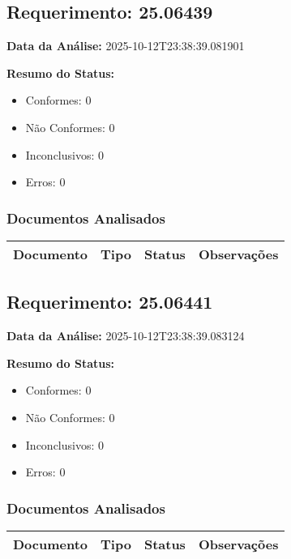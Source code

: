 \documentclass[12pt,a4paper]{article}
\begin{document}
\subsection{Requerimento: 25.06439}

\textbf{Data da Análise:} 2025-10-12T23:38:39.081901

\textbf{Resumo do Status:}
\begin{itemize}
    \item Conformes: 0
    \item Não Conformes: 0
    \item Inconclusivos: 0
    \item Erros: 0
\end{itemize}

\subsubsection{Documentos Analisados}

\begin{longtable}{|p{4cm}|p{2cm}|p{2cm}|p{6cm}|}
\hline
\textbf{Documento} & \textbf{Tipo} & \textbf{Status} & \textbf{Observações} \\
\hline
\endhead
\end{longtable}


\subsection{Requerimento: 25.06441}

\textbf{Data da Análise:} 2025-10-12T23:38:39.083124

\textbf{Resumo do Status:}
\begin{itemize}
    \item Conformes: 0
    \item Não Conformes: 0
    \item Inconclusivos: 0
    \item Erros: 0
\end{itemize}

\subsubsection{Documentos Analisados}

\begin{longtable}{|p{4cm}|p{2cm}|p{2cm}|p{6cm}|}
\hline
\textbf{Documento} & \textbf{Tipo} & \textbf{Status} & \textbf{Observações} \\
\hline
\endhead
\end{longtable}
\end{document}
